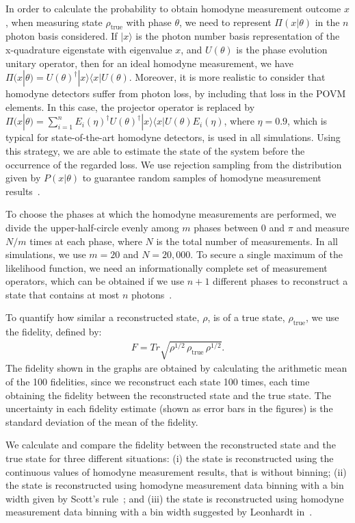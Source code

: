 \documentclass[
reprint,
superscriptaddress,
showpacs,
amsmath,
amssymb,
aps,
pra,
longbibliography
]{revtex4-1}
\begin{document}
In order to calculate the probability to obtain homodyne measurement outcome $x$, when measuring state $\rho_{\mathrm{true}}$ with phase $\theta$, we need to represent $\Pi (x|\theta)$ in the $n$ photon basis considered. If $|x\rangle$ is the photon number basis representation of the x-quadrature eigenstate with eigenvalue $x$, and $U(\theta)$ is the phase evolution unitary operator, then for an ideal homodyne measurement, we have $\Pi (x|\theta) = U(\theta)^{\dagger}|x\rangle \langle x| U(\theta)$. Moreover, it is more realistic to consider that homodyne detectors suffer from photon loss, by including that loss in the POVM elements. In this case, the projector operator is replaced by $\Pi (x|\theta) = \sum_{i=1}^{n} E_i(\eta)^{\dagger} U(\theta)^{\dagger}|x\rangle \langle x| U(\theta) E_i(\eta)$, where $\eta = 0.9$, which is typical for state-of-the-art homodyne detectors, is used in all
simulations. Using this strategy, we are able to estimate the state of the system before the occurrence of the regarded loss. We use rejection
sampling from the distribution given by $P(x|\theta)$ to guarantee random samples of homodyne measurement results~\cite{Kennedy1980}.

To choose the phases at which the homodyne measurements are performed, we divide the upper-half-circle evenly among $m$ phases between 0 and $\pi$ and measure $N/m$ times at each phase, where $N$ is the total number of measurements. In all simulations, we use $m=20$ and $N = 20,000$. To secure a single maximum of the likelihood function, we need an informationally complete set of measurement operators, which can be obtained if we use $n+1$ different phases to reconstruct a state that contains at most $n$ photons~\cite{Leonhardt1997}. 

To quantify how similar a reconstructed state, $\rho$, is of a true state, $\rho_{\mathrm{true}}$, we use the fidelity, defined by:
\begin{eqnarray}
F = Tr \sqrt{\rho^{1/2}\, \rho_{\mathrm{true}} \, \rho^{1/2}}.
\end{eqnarray}  
The fidelity shown in the graphs are obtained by calculating the arithmetic mean of the 100 fidelities, since we reconstruct each state 100 times, each time obtaining the fidelity between the reconstructed state and the true state. The uncertainty in each fidelity estimate (shown as error bars in the figures) is the standard deviation of the mean of the fidelity.

We calculate and compare the fidelity between the reconstructed state and the true state for three different situations: (i) the state is reconstructed using the continuous values of homodyne measurement results, that is without binning; (ii) the state is reconstructed using homodyne measurement data binning with a bin width given by Scott's rule~\cite{Scott2010}; and (iii) the state is reconstructed using homodyne measurement data binning with a bin width suggested by Leonhardt in~\cite{Leonhardt1997}.
\end{document}
